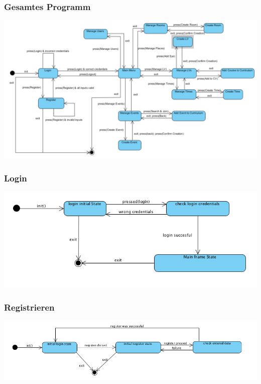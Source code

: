 \documentclass[a4paper,12pt]{article}
\begin{document}
		\subsubsection*{Gesamtes Programm}
			\begin{center}
				\includegraphics[scale=.5]{sc_all.png}
			\end{center}
		\subsubsection*{Login}
			\begin{center}
				\includegraphics[scale=.5]{sc_login.png}
			\end{center}
		\subsubsection*{Registrieren}
			\begin{center}
				\includegraphics[scale=.5]{sc_register.png}
			\end{center}
\end{document}
